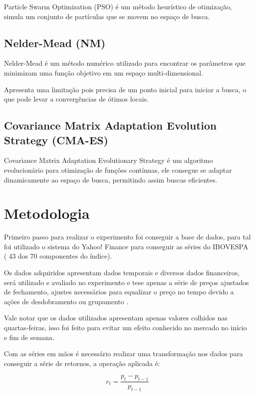 \documentclass[preprint,12pt]{elsarticle}
\begin{document}
Particle Swarm Optimization \cite{Kennedy:2010} \cite{Clerc2002} (PSO) é um método heurístico de otimização, simula um conjunto de partículas que se movem no espaço de busca.

\subsection{Nelder-Mead (NM)}

Nelder-Mead \cite{Nelder1965} é um método numérico utilizado para encontrar os parâmetros que minimizam uma função objetivo em um espaço multi-dimensional.

Apresenta uma limitação pois precisa de um ponto inicial para iniciar a busca, o que pode levar a convergências de ótimos locais.

\subsection{Covariance Matrix Adaptation Evolution Strategy (CMA-ES)}

Covariance Matrix Adaptation Evolutionary Strategy \cite{Hansen2001} \cite{wiki:xxx} é um algoritmo evolucionário para otimização de funções contínuas, ele consegue se adaptar dinamicamente ao espaço de busca, permitindo assim buscas eficientes.

\section{Metodologia}

Primeiro passo para realizar o experimento foi conseguir a base de dados, para tal foi utilizado o sistema do Yahoo! Finance \cite{yahoo} para conseguir as séries do IBOVESPA ( 43 dos 70 componentes do índice). 

Os dados adquiridos apresentam dados temporais e diversos dados financeiros, será utilizado e avaliado no experimento e tese apenas a série de preços ajustados de fechamento, ajustes necessários para equalizar o preço no tempo devido a ações de desdobramento ou grupamento \cite{invest}.

Vale notar que os dados utilizados apresentam apenas valores colhidos nas quartas-feiras, isso foi feito para evitar um efeito\cite[p. 404]{mptbook} conhecido no mercado no início e fim de semana.

Com as séries em mãos é necessário realizar uma transformação nos dados para conseguir a série de retornos, a operação aplicada é:

\begin{equation}
r_{t} = \frac{p_{t} - p_{t-1}}{p_{t-1}}
\end{equation}
\end{document}
